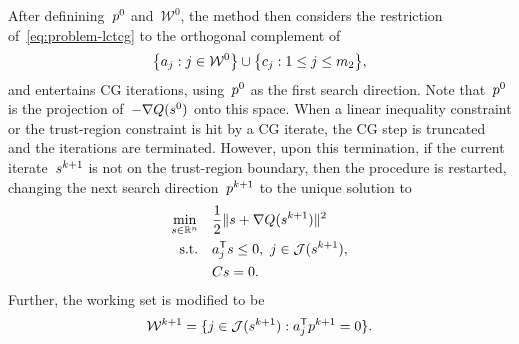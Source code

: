 After definining~$\pstep[0]$ and~$\mathcal{W}^0$, the method then considers the restriction of~\cref{eq:problem-lctcg} to the orthogonal complement of
\begin{equation*}
    \set[\big]{a_j : j \in \mathcal{W}^0} \cup \set[\big]{c_j : 1 \le j \le m_2},
\end{equation*}
and entertains CG iterations, using~$\pstep[0]$ as the first search direction.
Note that~$\pstep[0]$ is the projection of~$-\nabla Q(\sstep[0])$ onto this space.
When a linear inequality constraint or the trust-region constraint is hit by a CG iterate, the CG step is truncated and the iterations are terminated.
However, upon this termination, if the current iterate~$\sstep[k + 1]$ is not on the trust-region boundary, then the procedure is restarted, changing the next search direction~$\pstep[k + 1]$ to the unique solution to
\begin{subequations}
    \label{eq:tcg-linear-working-set-after}
    \begin{align}
        \min_{\sstep \in \R^n}  & \quad \frac{1}{2} \norm{\sstep + \nabla Q(\sstep[k + 1])}^2\\
        \text{s.t.}             & \quad a_j^{\T} \sstep \le 0, ~ j \in \mathcal{J}(\sstep[k + 1]),\\
                                & \quad C \sstep = 0.
    \end{align}
\end{subequations}
Further, the working set is modified to be
\begin{equation}
    \label{eq:tcg-linear-working-set-restart}
    \mathcal{W}^{k + 1} = \set{j \in \mathcal{J}(\sstep[k + 1]) : a_j^{\T} \pstep[k + 1] = 0}.
\end{equation}


